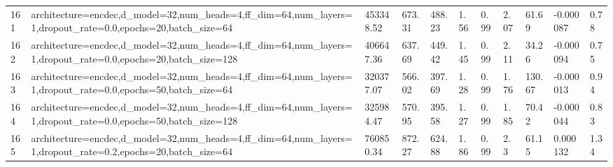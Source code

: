\begin{longtable}{C{0.8cm} L{2cm} C{1.15cm} C{1.15cm} C{1.15cm} C{1.15cm} C{0.85cm} C{1.25cm} C{1.2cm} C{1.5cm} C{1.0cm}}
161 & architecture=encdec,\newline d\_model=32,\newline num\_heads=4,\newline ff\_dim=64,\newline num\_layers=1,\newline dropout\_rate=0.0,\newline epochs=20,\newline batch\_size=64 & 453348.52 & 673.31 & 488.23 & 1.56 & 0.99 & 2.07 & 61.69 & -0.000087 & 0.78 \\
162 & architecture=encdec,\newline d\_model=32,\newline num\_heads=4,\newline ff\_dim=64,\newline num\_layers=1,\newline dropout\_rate=0.0,\newline epochs=20,\newline batch\_size=128 & 406647.36 & 637.69 & 449.42 & 1.45 & 0.99 & 2.11 & 34.26 & -0.000094 & 0.75 \\
163 & architecture=encdec,\newline d\_model=32,\newline num\_heads=4,\newline ff\_dim=64,\newline num\_layers=1,\newline dropout\_rate=0.0,\newline epochs=50,\newline batch\_size=64 & 320377.07 & 566.02 & 397.69 & 1.28 & 0.99 & 1.76 & 130.67 & -0.000013 & 0.94 \\
164 & architecture=encdec,\newline d\_model=32,\newline num\_heads=4,\newline ff\_dim=64,\newline num\_layers=1,\newline dropout\_rate=0.0,\newline epochs=50,\newline batch\_size=128 & 325984.47 & 570.95 & 395.58 & 1.27 & 0.99 & 1.85 & 70.42 & -0.000044 & 0.83 \\
165 & architecture=encdec,\newline d\_model=32,\newline num\_heads=4,\newline ff\_dim=64,\newline num\_layers=1,\newline dropout\_rate=0.2,\newline epochs=20,\newline batch\_size=64 & 760850.34 & 872.27 & 624.88 & 1.86 & 0.99 & 2.3 & 61.15 & 0.000132 & 1.34 \\

\end{longtable}

